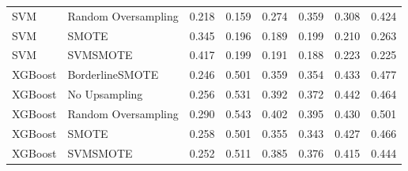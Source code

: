 \begin{tabular}{llllllll}
                         SVM & Random Oversampling & 0.218 &                     0.159 &                 0.274 &                  0.359 &                                   0.308 &     0.424 \\
                         SVM &               SMOTE & 0.345 &                     0.196 &                 0.189 &                  0.199 &                                   0.210 &     0.263 \\
                         SVM &            SVMSMOTE & 0.417 &                     0.199 &                 0.191 &                  0.188 &                                   0.223 &     0.225 \\
                     XGBoost &     BorderlineSMOTE & 0.246 &                     0.501 &                 0.359 &                  0.354 &                                   0.433 &     0.477 \\
                     XGBoost &       No Upsampling & 0.256 &                     0.531 &                 0.392 &                  0.372 &                                   0.442 &     0.464 \\
                     XGBoost & Random Oversampling & 0.290 &                     0.543 &                 0.402 &                  0.395 &                                   0.430 &     0.501 \\
                     XGBoost &               SMOTE & 0.258 &                     0.501 &                 0.355 &                  0.343 &                                   0.427 &     0.466 \\
                     XGBoost &            SVMSMOTE & 0.252 &                     0.511 &                 0.385 &                  0.376 &                                   0.415 &     0.444 \\
\bottomrule
\end{tabular}
